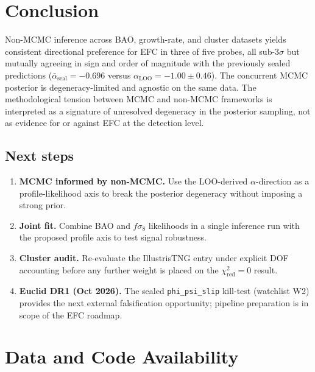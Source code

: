 \documentclass[11pt,a4paper]{article}
\begin{document}
\section{Conclusion}

Non-MCMC inference across BAO, growth-rate, and cluster datasets yields consistent directional preference for EFC in three of five probes, all sub-$3\sigma$ but mutually agreeing in sign and order of magnitude with the previously sealed predictions ($\bar\alpha_{\mathrm{seal}} = -0.696$ versus $\alpha_{\mathrm{LOO}} = -1.00 \pm 0.46$). The concurrent MCMC posterior is degeneracy-limited and agnostic on the same data. The methodological tension between MCMC and non-MCMC frameworks is interpreted as a signature of unresolved degeneracy in the posterior sampling, not as evidence for or against EFC at the detection level.

\subsection{Next steps}

\begin{enumerate}[leftmargin=22pt,itemsep=2pt]
  \item \textbf{MCMC informed by non-MCMC.} Use the LOO-derived $\alpha$-direction as a profile-likelihood axis to break the posterior degeneracy without imposing a strong prior.
  \item \textbf{Joint fit.} Combine BAO and $f\sigma_8$ likelihoods in a single inference run with the proposed profile axis to test signal robustness.
  \item \textbf{Cluster audit.} Re-evaluate the IllustrisTNG entry under explicit DOF accounting before any further weight is placed on the $\chi^2_{\mathrm{red}} = 0$ result.
  \item \textbf{Euclid DR1 (Oct 2026).} The sealed \texttt{phi\_psi\_slip} kill-test (watchlist W2) provides the next external falsification opportunity; pipeline preparation is in scope of the EFC roadmap.
\end{enumerate}

\section{Data and Code Availability}
\end{document}
